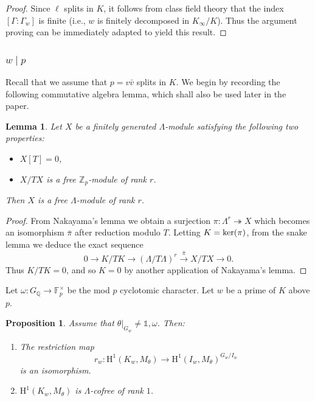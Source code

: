 \documentclass[10pt]{amsart}
\numberwithin{equation}{section}
\newtheorem{lemma}[theorem]{Lemma}
\newtheorem{prop}[theorem]{Proposition}
\theoremstyle{definition}
\theoremstyle{remark}
\newcommand{\Z}{\mathbb{Z}}
\newcommand{\Q}{\mathbb{Q}}
\newcommand{\rH}{\mathrm{H}}
\begin{document}
\begin{proof} 
Since $\ell$ splits in $K$, it follows from class field theory that the index $[\Gamma:\Gamma_w]$ is finite (i.e., $w$ is finitely decomposed in $K_\infty/K$). Thus the argument proving \cite[Prop.~2.4]{greenvats} can be immediately adapted to yield this result.
\end{proof}


\subsubsection{$w\mid p$} Recall that we assume that $p=v\bar{v}$ splits in $K$. We begin by recording the following commutative algebra lemma, which shall also be used later in the paper.

\begin{lemma}\label{lem:commalg}
Let $X$ be a finitely generated $\Lambda$-module satisfying the following two properties: 
\begin{itemize}
\item $X[T]=0$, 
\item $X/TX$ is a free $\Z_p$-module of rank $r$. 
\end{itemize}
Then $X$ is a free $\Lambda$-module of rank $r$.
\end{lemma}

\begin{proof}
From Nakayama's lemma we obtain a surjection $\pi:\Lambda^r\twoheadrightarrow X$ which becomes an isomorphism $\bar{\pi}$ after reduction modulo $T$. Letting $K={\rm ker}(\pi)$, from the snake lemma we deduce the exact sequence
\[
0\rightarrow K/TK\rightarrow(\Lambda/T\Lambda)^r\xrightarrow{\bar{\pi}}X/TX\rightarrow 0.
\]
Thus $K/TK=0$, and so $K=0$ by another application of Nakayama's lemma. 
\end{proof}

Let $\omega:G_\Q\rightarrow \mathbb{F}_p^\times$ be the mod $p$ cyclotomic character.  
Let $w$ be a prime of $K$ above $p$.

\begin{prop}\label{propw=v}
Assume that $\theta\vert_{G_w}\neq\mathds{1},\omega$. Then:
\begin{enumerate}
\item[(i)] The restriction map
\[
r_w:\rH^1(K_w,M_\theta)\rightarrow\rH^1(I_w,M_\theta)^{G_w/I_w}
\]
is an isomorphism. %
\item[(ii)] $\rH^1(K_w,M_{\theta})$ is $\Lambda$-cofree of rank $1$.
\end{enumerate}
\end{prop}
\end{document}
